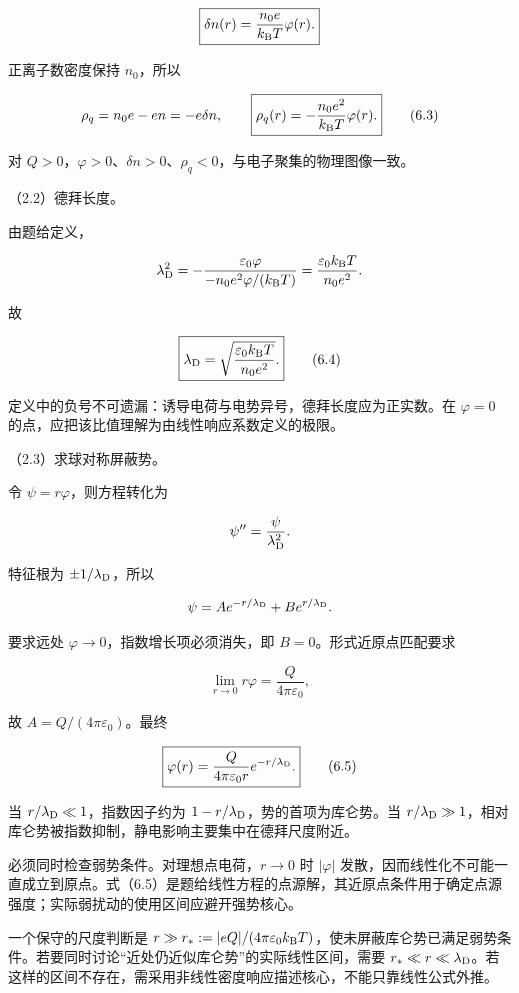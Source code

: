 \documentclass[12pt,a4paper,fontset=fandol]{ctexart}
\begin{document}
\[
\boxed{\delta n(r)=\frac{n_0e}{k_{\rm B}T}\varphi(r).}
\]

正离子数密度保持 \(n_0\)，所以

\[
\rho_q=n_0e-en=-e\delta n,
\qquad
\boxed{\rho_q(r)=-\frac{n_0e^2}{k_{\rm B}T}\varphi(r).}
\tag{6.3}
\]

对
\(Q>0\)，\(\varphi>0\)、\(\delta n>0\)、\(\rho_q<0\)，与电子聚集的物理图像一致。

（2.2）德拜长度。

由题给定义，

\[
\lambda_{\rm D}^2=-\frac{\varepsilon_0\varphi}
{-n_0e^2\varphi/(k_{\rm B}T)}
=\frac{\varepsilon_0k_{\rm B}T}{n_0e^2}.
\]

故

\[
\boxed{\lambda_{\rm D}=\sqrt{\frac{\varepsilon_0k_{\rm B}T}{n_0e^2}}.}
\tag{6.4}
\]

定义中的负号不可遗漏：诱导电荷与电势异号，德拜长度应为正实数。在
\(\varphi=0\) 的点，应把该比值理解为由线性响应系数定义的极限。

（2.3）求球对称屏蔽势。

令 \(\psi=r\varphi\)，则方程转化为

\[
\psi''=\frac{\psi}{\lambda_{\rm D}^2}.
\]

特征根为 \(\pm1/\lambda_{\rm D}\)，所以

\[
\psi=Ae^{-r/\lambda_{\rm D}}+Be^{r/\lambda_{\rm D}}.
\]

要求远处 \(\varphi\to0\)，指数增长项必须消失，即
\(B=0\)。形式近原点匹配要求

\[
\lim_{r\to0}r\varphi=\frac{Q}{4\pi\varepsilon_0},
\]

故 \(A=Q/(4\pi\varepsilon_0)\)。最终

\[
\boxed{\varphi(r)=\frac{Q}{4\pi\varepsilon_0r}e^{-r/\lambda_{\rm D}}.}
\tag{6.5}
\]

当 \(r/\lambda_{\rm D}\ll1\)，指数因子约为
\(1-r/\lambda_{\rm D}\)，势的首项为库仑势。当
\(r/\lambda_{\rm D}\gg1\)，相对库仑势被指数抑制，静电影响主要集中在德拜尺度附近。

必须同时检查弱势条件。对理想点电荷，\(r\to0\) 时 \(|\varphi|\)
发散，因而线性化不可能一直成立到原点。式（6.5）是题给线性方程的点源解，其近原点条件用于确定点源强度；实际弱扰动的使用区间应避开强势核心。

一个保守的尺度判断是
\(r\gg r_*:=|eQ|/(4\pi\varepsilon_0k_{\rm B}T)\)，使未屏蔽库仑势已满足弱势条件。若要同时讨论``近处仍近似库仑势''的实际线性区间，需要
\(r_*\ll r\ll\lambda_{\rm D}\)。若这样的区间不存在，需采用非线性密度响应描述核心，不能只靠线性公式外推。
\end{document}

